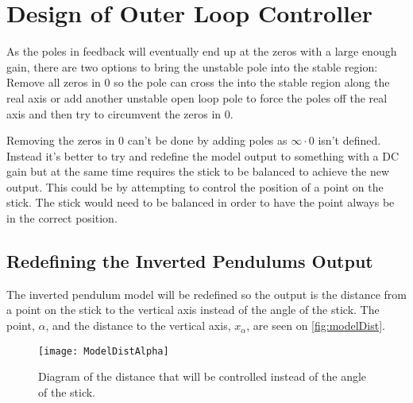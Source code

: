 \section{Design of Outer Loop Controller}
As the poles in feedback will eventually end up at the zeros with a large enough gain, there are two options to bring the unstable pole into the stable region: Remove all zeros in 0 so the pole can cross the into the stable region along the real axis or add another unstable open loop pole to force the poles off the real axis and then try to circumvent the zeros in 0. 

Removing the zeros in 0 can't be done by adding poles as $\infty \cdot 0$ isn't defined. Instead it's better to try and redefine the model output to something with a DC gain but at the same time requires the stick to be balanced to achieve the new output. This could be by attempting to control the position of a point on the stick. The stick would need to be balanced in order to have the point always be in the correct position.


\subsection{Redefining the Inverted Pendulums Output} \label{subsec:InvPendOuterLoopRedef}
The inverted pendulum model will be redefined so the output is the distance from a point on the stick to the vertical axis instead of the angle of the stick. The point, $\alpha$, and the distance to the vertical axis, $x_\alpha$, are seen on \autoref{fig:modelDist}.

\begin{figure}[htbp]
\centering
\texttt{[image: ModelDistAlpha]}
\caption{Diagram of the distance that will be controlled instead of the angle of the stick.}
\label{fig:modelDist}
\end{figure}

